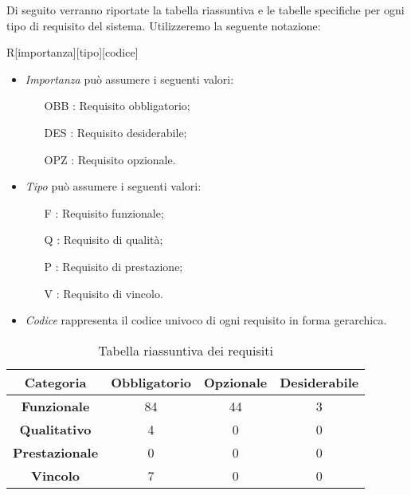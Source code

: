 Di seguito verranno riportate la tabella riassuntiva e le tabelle specifiche per ogni tipo di requisito del sistema. Utilizzeremo la seguente notazione:

R[importanza][tipo][codice]

\begin{itemize}
	\item \textit{Importanza} può assumere i seguenti valori:
	\begin{itemize}
		\item [OBB]: Requisito obbligatorio;
		\item [DES]: Requisito desiderabile;
		\item [OPZ]: Requisito opzionale.
	\end{itemize}
	
	\item \textit{Tipo} può assumere i seguenti valori:
	\begin{itemize}
		\item [F] : Requisito funzionale;
		\item [Q] : Requisito di qualità;
		\item [P] : Requisito di prestazione;
		\item [V] : Requisito di vincolo.
	\end{itemize}
	
	\item \textit{Codice} rappresenta il codice univoco di ogni requisito in forma gerarchica.
\end{itemize}

	\begin{table}[h]
		\centering
		\begin{tabular}{|c|c|c|c|}
			\toprule
			
			\textbf{Categoria} & \textbf{Obbligatorio} & \textbf{Opzionale} & \textbf{Desiderabile} \\
			
			\midrule
			\textbf{Funzionale} & 84 & 44 & 3 \\ \midrule
			\textbf{Qualitativo} & 4 & 0 & 0 \\  \midrule
			\textbf{Prestazionale} & 0 & 0 & 0 \\ \midrule
			\textbf{Vincolo} & 7 & 0 & 0  \\
			
			\bottomrule
			
		\end{tabular}
		\caption{Tabella riassuntiva dei requisiti}
		
	\end{table}
	\newpage


\newpage


\newpage


\newpage


\newpage

%

